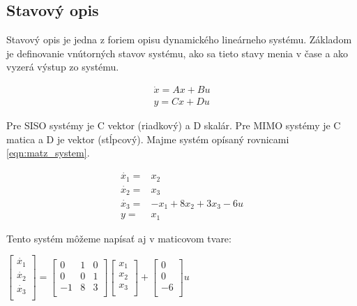 \documentclass[../main.tex]{subfiles}
\begin{document}
\subsection{Stavový opis}

Stavový opis je jedna z foriem opisu dynamického lineárneho systému. Základom je definovanie vnútorných stavov systému, ako sa tieto stavy menia v čase a ako vyzerá výstup zo systému.
	
\begin{equation}
	\begin{split}
		\dot{x} = Ax + Bu \\
		y = Cx + Du
	\end{split}
	\label{eqn:matz_stavovaRovnica}
\end{equation}

Pre SISO systémy je C vektor (riadkový) a D skalár. Pre MIMO systémy je C matica a D je vektor (stĺpcový). Majme systém opísaný rovnicami \ref{eqn:matz_system}.

\begin{equation}
	\begin{split}
		\dot{x_1} =& x_2 \\
		\dot{x_2} =& x_3 \\
		\dot{x_3} =& -x_1 + 8x_2 + 3x_3 - 6u \\
		y =& x_1
	\end{split}
	\label{eqn:matz_system}
\end{equation}

Tento systém môžeme napísať aj v maticovom tvare:

        \begin{center}
		$\begin{bmatrix} 
			\dot{x_1} \\ 
			\dot{x_2} \\ 
			\dot{x_3} \\ 
		\end{bmatrix}  = 
		\begin{bmatrix} 
			0 & 1 & 0 \\ 
			0 & 0 & 1 \\ 
			-1 & 8 & 3 \\ 
		\end{bmatrix} 
		\begin{bmatrix} 
			x_1 \\ 
			x_2 \\ 
			x_3 \\ 
		\end{bmatrix} +
		\begin{bmatrix} 
			0 \\ 
			0 \\ 
			-6 \\ 
		\end{bmatrix}
		u $
	\label{eqn:matz_system2}
        \end{center}
\end{document}
